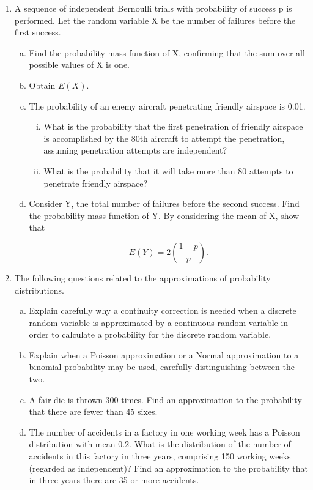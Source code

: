 \documentclass[a4paper,12pt]{article}
\begin{document}
\begin{enumerate}
\item A sequence of independent Bernoulli trials with probability of success p is performed.
Let the random variable X be the number of failures before the first success.

\begin{enumerate}[(a)]
\item Find the probability mass function of X, confirming that the sum over all
possible values of X is one.

\item Obtain $E(X)$.

\item The probability of an enemy aircraft penetrating friendly airspace is 0.01.
\begin{enumerate}[(i)]
\item  What is the probability that the first penetration of friendly airspace is
accomplished by the 80th aircraft to attempt the penetration, assuming
penetration attempts are independent?
\item  What is the probability that it will take more than 80 attempts to
penetrate friendly airspace?
\end{enumerate}
\item Consider Y, the total number of failures before the second success. Find the
probability mass function of Y. By considering the mean of X, show that

\[ E(Y) = 2\left(  \frac{1-p}{p} \right) .\]

\end{enumerate}


\item The following questions related to the approximations of probability distributions.
\begin{enumerate}[(a)]
\item Explain carefully why a continuity correction is needed when a discrete
random variable is approximated by a continuous random variable in order to
calculate a probability for the discrete random variable.
\item Explain when a Poisson approximation or a Normal approximation to a
binomial probability may be used, carefully distinguishing between the two.

\item A fair die is thrown 300 times. Find an approximation to the probability that
there are fewer than 45 sixes.

\item The number of accidents in a factory in one working week has a Poisson
distribution with mean 0.2.
What is the distribution of the number of accidents in this factory in three
years, comprising 150 working weeks (regarded as independent)? Find an
approximation to the probability that in three years there are 35 or more
accidents.
\end{enumerate}
\end{enumerate}
\end{document}
